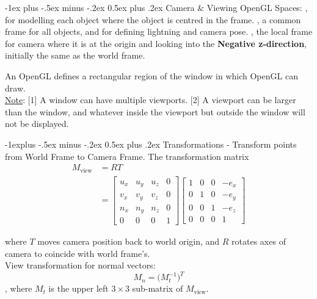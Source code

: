 \documentclass[10pt,landscape,letterpaper]{article}
\makeatletter
\renewcommand{\section}{\@startsection{section}{1}{0mm}%
                                {-1ex plus -.5ex minus -.2ex}%
                                {0.5ex plus .2ex}%
                                {\sffamily\large}}
\renewcommand{\subsection}{\@startsection{subsection}{2}{0mm}%
                                {-1explus -.5ex minus -.2ex}%
                                {0.5ex plus .2ex}%
                                {\sffamily\normalsize\itshape}}
\makeatother
\begin{document}
\begin{multicols}{3}
\section{Camera \& Viewing}
OpenGL Spaces: , for modelling each object where the object is centred in the frame. , a common frame for all objects, and for defining lightning and camera pose. , the local frame for camera where it is at the origin and looking into the \textbf{Negative z-direction}, initially the same as the world frame.

\smallskip

An OpenGL  defines a rectangular region of the window in which OpenGL can draw.
\\
\underline{Note}: [1] A window can have multiple viewports. [2] A viewport can be larger than the window, and whatever inside the viewport but outside the window will not be displayed.


\subsection{Transformations}
 - Transform points from World Frame to Camera Frame. The transformation matrix
\[
\begin{aligned}
M_\text{view} 
&= RT
\\
&= 
\begin{bmatrix}
u_x     & u_y   & u_z   & 0     \\
v_x     & v_y   & v_z   & 0     \\
n_x     & n_y   & n_z   & 0     \\
0       & 0     & 0     & 1     
\end{bmatrix}
\begin{bmatrix}
1       & 0     & 0     & -e_x  \\
0       & 1     & 0     & -e_y  \\
0       & 0     & 1     & -e_z  \\
0       & 0     & 0     & 1
\end{bmatrix}
\end{aligned}
\]

where $T$ moves camera position back to world origin, and $R$ rotates axes of camera to coincide with world frame's.
\\
View transformation for normal vectors:
\[
M_n = \big( M_t^{-1} \big)^T
\]
, where $M_t$ is the upper left $3 \times 3$ sub-matrix of $M_\text{view}$.


\end{multicols}
\end{document}
